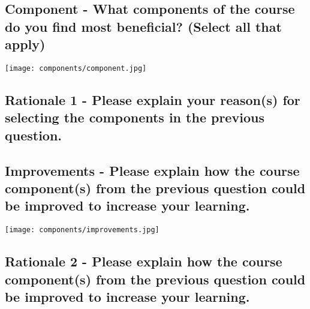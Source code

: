 \documentclass[11pt]{article}
\begin{document}
\subsection{Component - What components of the course do you find most beneficial? (Select all that apply)}
\texttt{[image: components/component.jpg]}

\subsection{Rationale 1 - Please explain your reason(s) for selecting the components in the previous question.}


\subsection{Improvements - Please explain how the course component(s) from the previous question could be improved to increase your learning.}
\texttt{[image: components/improvements.jpg]}

\subsection{Rationale 2 - Please explain how the course component(s) from the previous question could be improved to increase your learning.}

\end{document}
